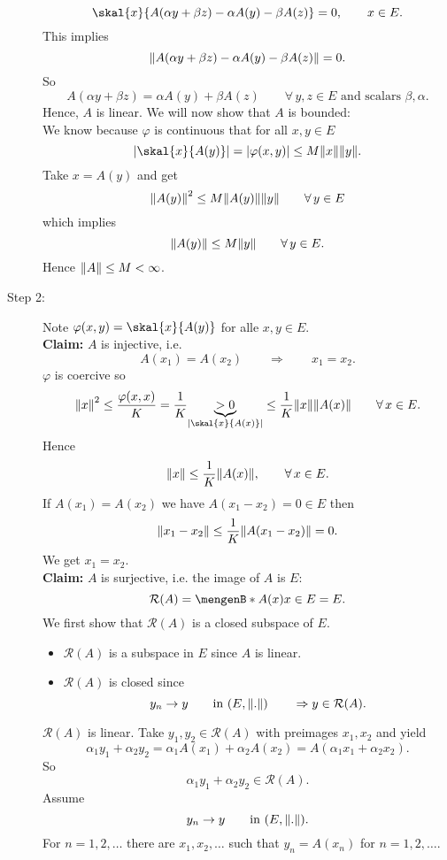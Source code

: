 \begin{beweis}
\begin{description}
		\[
			\skal{x}{A(\alpha y + \beta z)- \alpha A(y) - \beta A(z)} = 0, \qquad  x \in E.
		\]
		This implies 
		\[
			\norm{A(\alpha y + \beta z) - \alpha A(y) - \beta A(z)} = 0.
		\]
		So \[
			A( \alpha y+ \beta z) = \alpha A(y) + \beta A(z) \qquad \forall\, y,z \in E \text{ and scalars }\beta,\alpha.
		\]
		Hence, $A$ is linear. We will now show that $A$ is bounded: \\
		We know because $\varphi$ is continuous that for all $x,y \in E$
		\[
			\abs{\skal{x}{A(y)}} = \abs{\varphi(x,y)} \leq M \norm{x} \norm{y}.
		\]
		Take $x = A(y)$ and get
		\[
			\norm{A(y)}^2 \leq  M \norm{A(y)} \norm{y} \qquad \forall\, y \in E
		\]
		which implies
		\[
			\norm{A(y)} \leq M \norm{y} \qquad \forall\, y \in E.
		\]
		Hence $\norm{A} \leq M < \infty$.
		\item[Step 2:] Note $\varphi(x,y) = \skal{x}{A(y)}$ for alle $x,y \in E$. \\
		\textbf{Claim:} \text{    }$A$ is injective, i.e.
		\[
			A(x_1) = A(x_2) \qquad \Rightarrow \qquad x_1 = x_2.
 		\]
		$\varphi$ is coercive so
		\[
			\norm{x}^2 \leq \frac{\varphi(x,x)}{K} = \frac{1}{K} \underset{\abs{\skal{x}{A(x)}}}{\underbrace{>0}} \leq \frac{1}{K} \norm{x} \norm{A(x)} \qquad \forall\,  x \in E.
		\]
		Hence \[
			\norm{x} \leq  \frac{1}{K} \norm{A(x)}, \qquad \forall\, x \in E.
		\]
		If $A(x_1) = A(x_2)$ we have $A(x_1-x_2) = 0 \in E$ then
		\[
			\norm{x_1 - x_2} \leq \frac{1}{K} \norm{A(x_1 -x_2)} = 0.
		\]
		We get $x_1 = x_2$. \\
		\textbf{Claim:} \text{    }$A$ is surjective, i.e. the image of $A$ is $E$: \[
			\mathcal{R}(A) = \set[A(x)]{x \in E} = E.
		\] 
		We first show that $\mathcal{R}(A)$ is a closed subspace of $E$. 
		\begin{itemize}
			\item $\mathcal{R}(A)$ is a subspace in $E$ since $A$ is linear.
			\item $\mathcal{R}(A)$ is closed since
			\[
				y_n \to y \qquad \text{in }(E, \norm{.}) \qquad \Rightarrow y \in \mathcal{R}(A).
			\]			
		\end{itemize}
		$\mathcal{R}(A)$ is linear. Take $y_1,y_2 \in \mathcal{R}(A)$ with preimages $x_1,x_2$ and yield
		\[
			\alpha_1 y_1 + \alpha_2 y_2 = \alpha_1 A(x_1) + \alpha_2 A(x_2) = A(\alpha_1 x_1 + \alpha_2 x_2).
		\]
		So \[
			\alpha_1 y_1 + \alpha_2 y_2 \in \mathcal{R}(A).
		\]
		Assume \[
			y_n \to y \qquad \text{in }(E, \norm{.}).
		\]
		For $n=1,2,\dots$ there are $x_1,x_2,\dots$ such that $y_n= A(x_n)$ for $n=1,2,\dots$. \\

\end{description}
\end{beweis}
